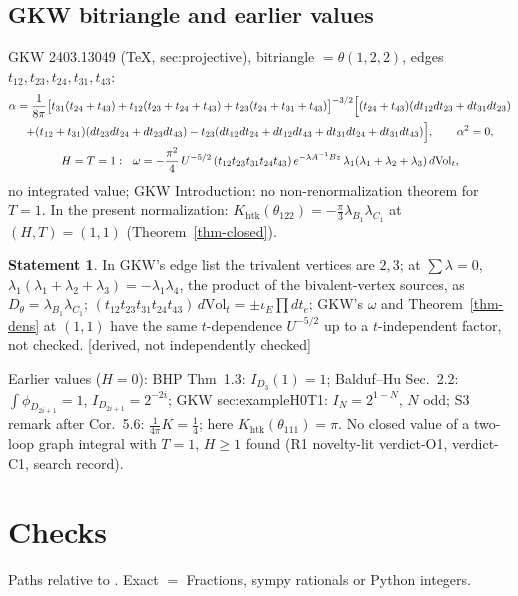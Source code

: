 \documentclass[10pt,a4paper]{article}
\numberwithin{equation}{section}
\theoremstyle{definition}
\newtheorem{dstatement}[theorem]{Statement}
\theoremstyle{remark}
\newcommand{\der}{\textup{[derived, not independently checked]}}
\newcommand{\htk}{\mathrm{htk}}
\begin{document}
\subsection{GKW bitriangle and earlier values}
GKW 2403.13049 (TeX, sec:projective), bitriangle $=\theta(1,2,2)$, edges $t_{12},t_{23},t_{24},t_{31},t_{43}$:
\begin{gather}
\alpha=\frac1{8\pi}\big[t_{31}(t_{24}+t_{43})+t_{12}(t_{23}+t_{24}+t_{43})+t_{23}(t_{24}+t_{31}+t_{43})\big]^{-3/2}\Big[(t_{24}+t_{43})(dt_{12}dt_{23}+dt_{31}dt_{23})\notag\\
+(t_{12}+t_{31})(dt_{23}dt_{24}+dt_{23}dt_{43})-t_{23}(dt_{12}dt_{24}+dt_{12}dt_{43}+dt_{31}dt_{24}+dt_{31}dt_{43})\Big],\qquad\alpha^2=0,\\
H=T=1:\ \ \omega=-\frac{\pi^2}4\,U^{-5/2}\,(t_{12}t_{23}t_{31}t_{24}t_{43})\,e^{-\lambda A^{-1}Bz}\,\lambda_1(\lambda_1+\lambda_2+\lambda_3)\,d\mathrm{Vol}_t,
\end{gather}
no integrated value; GKW Introduction: no non-renormalization theorem for $T=1$. In the present normalization: $K_\htk(\theta_{122})=-\frac\pi3\lambda_{B_1}\lambda_{C_1}$ at $(H,T)=(1,1)$ (Theorem~\ref{thm-closed}).
\begin{dstatement}
In GKW's edge list the trivalent vertices are $2,3$; at $\sum\lambda=0$, $\lambda_1(\lambda_1+\lambda_2+\lambda_3)=-\lambda_1\lambda_4$, the product of the bivalent-vertex sources, as $D_\theta=\lambda_{B_1}\lambda_{C_1}$; $(t_{12}t_{23}t_{31}t_{24}t_{43})\,d\mathrm{Vol}_t=\pm\iota_E\prod dt_e$; GKW's $\omega$ and Theorem~\ref{thm-dens} at $(1,1)$ have the same $t$-dependence $U^{-5/2}$ up to a $t$-independent factor, not checked. \der
\end{dstatement}
Earlier values ($H=0$): BHP Thm~1.3: $I_{D_3}(1)=1$; Balduf--Hu Sec.~2.2: $\int\phi_{D_{2i+1}}=1$, $I_{D_{2i+1}}=2^{-2i}$; GKW sec:exampleH0T1: $I_N=2^{1-N}$, $N$ odd; S3 remark after Cor.~5.6: $\frac1{4\pi}K=\frac14$; here $K_\htk(\theta_{111})=\pi$. No closed value of a two-loop graph integral with $T=1$, $H\ge1$ found (R1 novelty-lit verdict-O1, verdict-C1, search record).

\section{Checks}\label{sec-checks}

Paths relative to . Exact $=$ Fractions, sympy rationals or Python integers.
\end{document}
